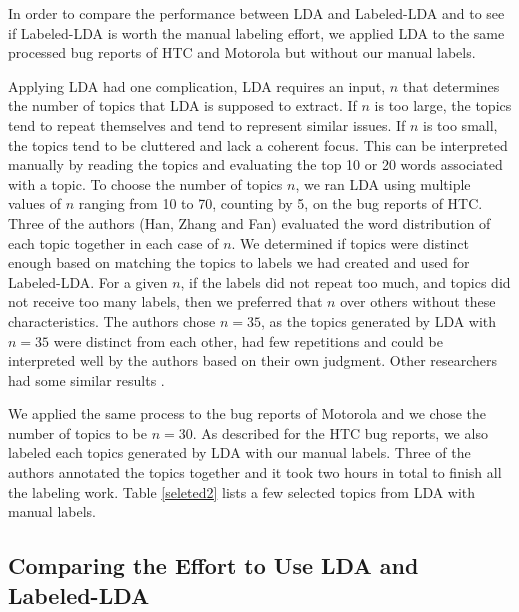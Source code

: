 \documentclass[10pt, conference, compsocconf]{IEEEtran}
\begin{document}


In order to compare the performance between LDA and Labeled-LDA and
 to see if Labeled-LDA is worth the manual labeling effort, 
we applied LDA to the same processed bug reports of HTC and Motorola
but without our manual labels. 

Applying LDA had one complication, LDA requires an input, $n$ that
determines the number of topics that LDA is supposed to extract. 
If $n$ is too large, the topics tend to repeat themselves and tend to
represent similar issues. 
If $n$ is too small, the topics tend to be cluttered and lack a
coherent focus.
This can be interpreted manually by reading the topics and evaluating
the top 10 or 20 words associated with a topic.
To choose the number of topics $n$, we ran LDA using multiple values
of $n$ ranging from 10 to 70, counting by 5,
on the bug reports of HTC. 
Three of the authors (Han, Zhang and Fan) evaluated the word distribution of each topic
together in each case of $n$. 
We determined if topics were distinct enough based on matching the
topics to labels we had created and used for Labeled-LDA. 
For a given $n$, if the labels did not repeat too much, and topics did not receive too
many labels, then we preferred that $n$ over others without these
characteristics.
The authors chose $n = 35$, as the topics generated by LDA with $n = 35$
were distinct from each other, had few repetitions and could be
interpreted well by the authors based on their own judgment.
Other researchers had some similar results
\cite{Thomas:2011,Hindle2011}. 

We applied the same process to the bug reports of Motorola and we chose
the number of topics to be $n = 30$. 
As described for the HTC bug reports, we also labeled each topics
generated by LDA with our manual labels.
Three of the authors annotated the topics together and it took two
hours in total to finish all the labeling work. 
Table \ref{seleted2} lists a few selected topics from LDA with manual labels.


\subsection{Comparing the Effort to Use LDA and Labeled-LDA}

\end{document}
